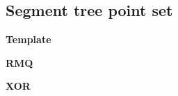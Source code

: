 \subsection{Segment tree point set}
    \textbf{Template}
    

    \textbf{RMQ}
    

    \textbf{XOR}
    


